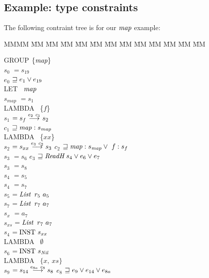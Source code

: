
 
\clearpage{}
\subsection{Example: type constraints}

The following contraint tree is for our $\operatorname{\mathit{map}}$ example:

\begin{tabbing}
MMMM 	\= MM \= MM \= MM \= MM \= MM \= MM \= MM \= MM \= MM \= MM \= MM \= MM \kill

GROUP $\{ \operatorname{\mathit{map}} \}$ \\	
	\> $s_0$	\> $ = s_{19}$ \\
	\> $e_0$	\> $\sqsupseteq e_1 \lor e_{19}$
\\[1ex]
	\> LET \ $\operatorname{\mathit{map}}$ \\
	\> 		\> $s_{map}$	\> $ = s_1$ 
\\[1ex]
	\>		\> LAMBDA \ \{$f$\} \\
	\>		\> 		\> $s_1$	\> $ = s_f    \stackrel{e_2 \ c_1}{\longrightarrow} s_2$ \\
	\>		\>		\> $c_1$ 	\> $\sqsupseteq \operatorname{\mathit{map}} : s_{\operatorname{\mathit{map}}}$ 
\\[1ex]
	\>		\> 		\> LAMBDA \ \{$xx$\} \\
	\>		\>		\> \> $s_2$		\> $ = s_{xx} \stackrel{e_3 \ c_2}{\longrightarrow} s_3$ 
	\>		\>		\> \> $c_2$		\> $\sqsupseteq \operatorname{\mathit{map}} : s_{\operatorname{\mathit{map}}} \lor \ f : s_f$ 
\\[1ex]
	\>		\>		\> \> $s_3$		\> $ = s_6$ 
	\>		\>		\> \> $e_3$ 		\> $\sqsupseteq \operatorname{\mathit{ReadH}} s_4 \lor e_6 \lor e_7$  \\
	\>		\>		\> \> $s_3$		\> $ = s_8$  \\	
	\>		\>		\> \> $s_4$		\> $ = s_5$  \\
	\>		\>		\> \> $s_4$		\> $ = s_7$  \\
	\>		\>		\> \> $s_5$		\> $ = \operatorname{\mathit{List}} \ r_5 \ a_5$ \\
	\>		\>		\> \> $s_7$		\> $ = \operatorname{\mathit{List}} \ r_7 \ a_7$ \\
	\>		\>		\> \> $s_x$		\> $ = a_7$ \\
	\>		\>		\> \> $s_{xs}$		\> $ = \operatorname{\mathit{List}} \ r_7 \ a_7$ \\
	\>		\>		\> \> $s_4$		\> $ = \textrm{INST} \ s_{xx}$  \\
	\>		\>		\> \> LAMBDA \ $\emptyset$	\\
	\>		\>		\> \> \> $s_6$		\> $ = \textrm{INST} \ s_{\operatorname{\mathit{Nil}}}$ 
\\[1ex]
	\>		\>		\> \> LAMBDA \ $\{ x, \ xs \}$					\\
	\>		\>		\> \> \> $s_9$		\> $ = s_{14} \stackrel{e_{8a} \ c_8}{\longrightarrow} s_8$ 
	\> 		\> 		\> \> \> $e_8$		\> $\sqsupseteq e_9 \lor e_{14} \lor e_{8a}$ 

\end{tabbing}
